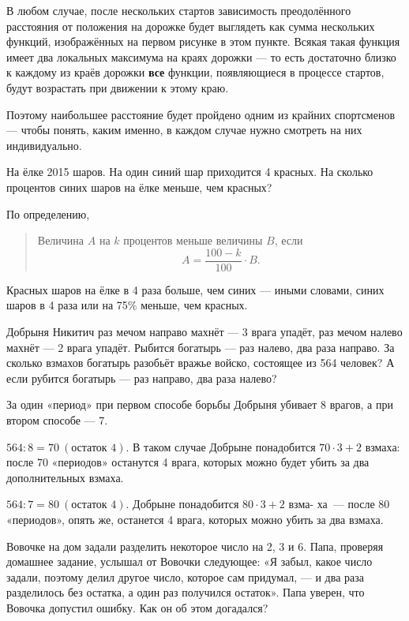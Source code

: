 \begin{itemize}
	В любом случае, после нескольких стартов зависимость преодолённого расстояния от положения на дорожке будет выглядеть как сумма нескольких функций, изображённых на первом рисунке в этом пункте. Всякая такая функция имеет два локальных максимума на краях дорожки — то есть достаточно близко к каждому из краёв дорожки {\bfseries все} функции, появляющиеся в процессе стартов, будут возрастать при движении к этому краю.
	
	Поэтому наибольшее расстояние будет пройдено одним из крайних спортсменов — чтобы понять, каким именно, в каждом случае нужно смотреть на них индивидуально.

\end{itemize}


\begin{itemize}

	\itA На ёлке 2015 шаров. На один синий шар приходится 4 красных. На сколько процентов синих шаров на ёлке меньше, чем красных?
	
	\itr По определению,
	
	\begin{quote}
		Величина $A$ на $k$ процентов меньше величины $B$, если
		$$A = \frac{100-k}{100} \cdot B.$$
	\end{quote}
	
	Красных шаров на ёлке в 4 раза больше, чем синих — иными словами, синих шаров в 4 раза или на 75\% меньше, чем красных.

	\itB Добрыня Никитич раз мечом направо махнёт — 3 врага упадёт, раз мечом налево махнёт — 2 врага упадёт. Рыбится богатырь — раз налево, два раза направо. За сколько взмахов богатырь разобьёт вражье войско, состоящее из 564 человек? А если рубится богатырь — раз направо, два раза налево?
	
	\itr За один «период» при первом способе борьбы Добрыня убивает 8 врагов, а при втором способе — 7.
	
	\subitem $564 : 8 = 70\ (\text{остаток\ } 4)$. В таком случае Добрыне понадобится $70 \cdot 3 + 2$ взмаха: после 70 «периодов» останутся 4 врага, которых можно будет убить за два дополнительных взмаха.
	
	\subitem $564 : 7 = 80\ (\text{остаток\ } 4)$. Добрыне понадобится $80 \cdot 3 + 2$ взма- ха~— после 80 «периодов», опять же, останется 4 врага, которых \linebreak можно убить за два взмаха.
	
	\itC Вовочке на дом задали разделить некоторое число на 2, 3 и 6. Папа, проверяя домашнее задание, услышал от Вовочки следующее: «Я забыл, какое число задали, поэтому делил другое число, которое сам придумал, — и два раза разделилось без остатка, а один раз получился остаток». Папа уверен, что Вовочка допустил ошибку. Как он об этом догадался?
	

\end{itemize}
